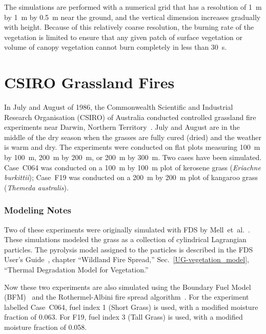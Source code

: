The simulations are performed with a numerical grid that has a resolution of 1~m by 1~m by 0.5~m near the ground, and the vertical dimension increases gradually with height. Because of this relatively coarse resolution, the burning rate of the vegetation is limited to ensure that any given patch of surface vegetation or volume of canopy vegetation cannot burn completely in less than 30~s.





\section{CSIRO Grassland Fires}
\label{CSIRO_Grassland_Fires_Description}

In July and August of 1986, the Commonwealth Scientific and Industrial Research Organisation (CSIRO) of Australia conducted controlled grassland fire experiments near Darwin, Northern Territory~\cite{Cheney:IJWF1993}. July and August are in the middle of the dry season when the grasses are fully cured (dried) and the weather is warm and dry. The experiments were conducted on flat plots measuring 100~m by 100~m, 200~m by 200~m, or 200~m by 300~m. Two cases have been simulated. Case~C064 was conducted on a 100~m by 100~m plot of kerosene grass ({\it Eriachne burkittii}); Case~F19 was conducted on a 200~m by 200~m plot of kangaroo grass ({\it Themeda australis}).

\subsubsection{Modeling Notes}

Two of these experiments were originally simulated with FDS by Mell~et~al.~\cite{Mell:IJWF2007}. These simulations modeled the grass as a collection of cylindrical Lagrangian particles. The pyrolysis model assigned to the particles is described in the FDS User's Guide~\cite{FDS_Users_Guide}, chapter ``Wildland Fire Spread,'' Sec.~\ref{UG-vegetation_model}, ``Thermal Degradation Model for Vegetation.''

Now these two experiments are also simulated using the Boundary Fuel Model (BFM)~\cite{Perez-Ramirez:FT2017} and the Rothermel-Albini fire spread algorithm~\cite{Rothermel:1972,Albini:1976}. For the experiment labelled Case~C064, fuel index 1 (Short Grass) is used, with a modified moisture fraction of 0.063. For F19, fuel index 3 (Tall Grass) is used, with a modified moisture fraction of 0.058.


